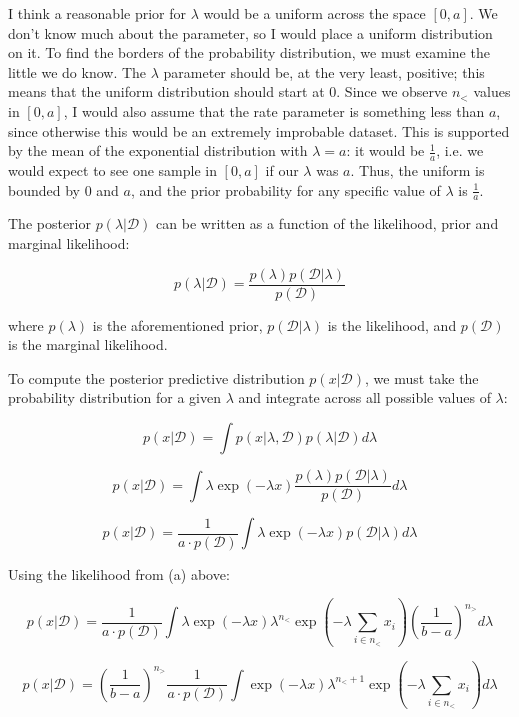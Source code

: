 \documentclass[11pt]{article}
\begin{document}
\begin{enumerate}[label=\textbf{\alph*.}]
        I think a reasonable prior for $\lambda$ would be a uniform across the space $[0, a]$. We don't know much about the parameter, so I would place a uniform distribution on it. To find the borders of the probability distribution, we must examine the little we do know. The $\lambda$ parameter should be, at the very least, positive; this means that the uniform distribution should start at $0$. Since we observe $n_<$ values in $[0, a]$, I would also assume that the rate parameter is something less than $a$, since otherwise this would be an extremely improbable dataset. This is supported by the mean of the exponential distribution with $\lambda = a$: it would be $\frac{1}{a}$, i.e. we would expect to see one sample in $[0, a]$ if our $\lambda$ was $a$. Thus, the uniform is bounded by $0$ and $a$, and the prior probability for any specific value of $\lambda$ is $\frac{1}{a}$.

        The posterior $p(\lambda|\mathcal{D})$ can be written as a function of the likelihood, prior and marginal likelihood:

        $$
        p(\lambda|\mathcal{D}) = \dfrac{p(\lambda) p(\mathcal{D}|\lambda)}{p(\mathcal{D})}
        $$

        where $p(\lambda)$ is the aforementioned prior, $p(\mathcal{D}|\lambda)$ is the likelihood, and $p(\mathcal{D})$ is the marginal likelihood.

        To compute the posterior predictive distribution $p(x|\mathcal{D})$, we must take the probability distribution for a given $\lambda$ and integrate across all possible values of $\lambda$:

        $$
        p(x|\mathcal{D}) = \int p(x|\lambda, \mathcal{D}) p(\lambda|\mathcal{D}) d \lambda
        $$

        $$
        p(x|\mathcal{D}) = \int \lambda \exp(-\lambda x) \dfrac{p(\lambda) p(\mathcal{D}|\lambda)}{p(\mathcal{D})} d \lambda
        $$

        $$
        p(x|\mathcal{D}) = \dfrac{1}{a \cdot p(\mathcal{D})} \int \lambda \exp(-\lambda x) p(\mathcal{D}|\lambda) d \lambda
        $$

        Using the likelihood from (a) above:

        $$
        p(x|\mathcal{D}) = \dfrac{1}{a \cdot p(\mathcal{D})} \int \lambda \exp(-\lambda x) \lambda^{n_<} \exp (-\lambda \sum_{i \in n_<} x_i) (\dfrac{1}{b - a})^{n_>} d \lambda
        $$

        $$
        p(x|\mathcal{D}) = (\dfrac{1}{b - a})^{n_>} \dfrac{1}{a \cdot p(\mathcal{D})} \int \exp(-\lambda x) \lambda^{n_< + 1} \exp (-\lambda \sum_{i \in n_<} x_i) d \lambda
        $$


\end{enumerate}
\end{document}
